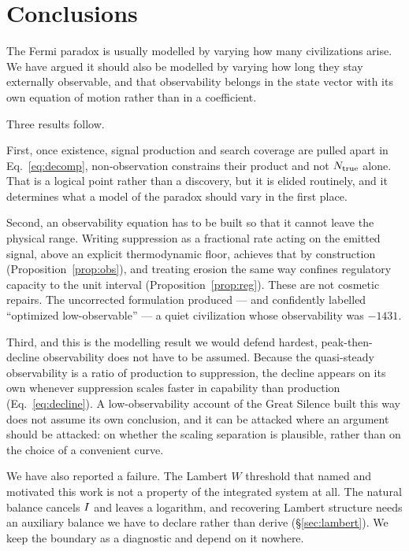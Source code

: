 \section{Conclusions}
\label{sec:conclusions}

The Fermi paradox is usually modelled by varying how many civilizations arise.
We have argued it should also be modelled by varying how long they stay
externally observable, and that observability belongs in the state vector with
its own equation of motion rather than in a coefficient.

Three results follow.

First, once existence, signal production and search coverage are pulled apart in
Eq.~\eqref{eq:decomp}, non-observation constrains their product and not $N_{\mathrm{true}}$
alone. That is a logical point rather than a discovery, but it is elided
routinely, and it determines what a model of the paradox should vary in the
first place. \Established

Second, an observability equation has to be built so that it cannot leave the
physical range. Writing suppression as a fractional rate acting on the emitted
signal, above an explicit thermodynamic floor, achieves that by construction
(Proposition~\ref{prop:obs}), and treating erosion the same way confines
regulatory capacity to the unit interval (Proposition~\ref{prop:reg}). These are
not cosmetic repairs. The uncorrected formulation produced --- and confidently
labelled ``optimized low-observable'' --- a quiet civilization whose
observability was $-1431$.

Third, and this is the modelling result we would defend hardest,
peak-then-decline observability does not have to be assumed. Because the
quasi-steady observability is a ratio of production to suppression, the decline
appears on its own whenever suppression scales faster in capability than
production (Eq.~\eqref{eq:decline}). A low-observability account of the Great
Silence built this way does not assume its own conclusion, and it can be
attacked where an argument should be attacked: on whether the scaling separation
is plausible, rather than on the choice of a convenient curve. \Plausible

We have also reported a failure. The Lambert $W$ threshold that named and
motivated this work is not a property of the integrated system at all. The
natural balance cancels $I$ and leaves a logarithm, and recovering Lambert
structure needs an auxiliary balance we have to declare rather than derive
(\S\ref{sec:lambert}). We keep the boundary as a diagnostic and depend on it
nowhere.

